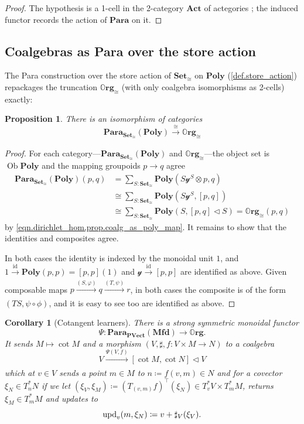 \documentclass[11pt, oneside, article]{memoir}
\theoremstyle{definition}
\theoremstyle{plain}
\newtheorem{proposition}[proposition]{Proposition}
\newtheorem{corollary}[corollary]{Corollary}
\DeclareMathOperator{\ob}{Ob}
\newcommand{\Cat}[1]{\mathbf{#1}}%
\newcommand{\id}{\mathrm{id}}
\newcommand{\To}[2][]{\xrightarrow[#1]{#2}}
\newcommand{\tn}[1]{\textnormal{#1}}
\newcommand{\smset}{\Cat{Set}}
\newcommand{\upd}{\tn{upd}}
\newcommand{\yon}{\mathcal{y}}
\newcommand{\poly}{\Cat{Poly}}
\newcommand{\tri}{\mathbin{\triangleleft}}
\newcommand{\org}{{\mathbb{O}\Cat{rg}}}
\newcommand{\mfd}{\Cat{Mfd}}
\newcommand{\Para}{\Cat{Para}}
\newcommand{\para}[2]{\Para_{#1}(#2)}
\newcommand{\pvect}{\Cat{PVect}}
\begin{document}
\begin{proof}
The hypothesis is a 1-cell in the 2-category $\Cat{Act}$ of actegories \cite[\S 3.6, eq.~(3.59)]{capucci2024actegories}; the induced functor records the action of $\Cat{Para}$ on it.\qedhere
\end{proof}

\subsection{Coalgebras as Para over the store action}\label{sec.org_as_para}

The Para construction over the store action of $\smset_\cong$ on $\poly$ (\cref{def.store_action}) repackages the truncation $\org_{\cong}$ (with only coalgebra isomorphisms as 2-cells) exactly:

\begin{proposition}\label{prop.org_as_para}
There is an isomorphism of categories
\[
\para{\Cat{Set}_{\cong}}{\poly}\To{\cong}\org_\cong
\]
\end{proposition}

\begin{proof}
For each category---$\para{\Cat{Set}_{\cong}}{\poly}$ and $\org_\cong$---the object set is $\ob\poly$ and the mapping groupoids $p\to q$ agree
\begin{align*}
	\para{\Cat{Set}_{\cong}}{\poly}(p,q)&=
  \sum_{S:\smset_\cong}\poly(S\yon^S\otimes p, q)\\&\cong
  \sum_{S:\smset_\cong}\poly(S\yon^S,[p,q])\\&\cong
  \sum_{S:\smset_\cong}\poly(S,[p,q]\tri S)=\org_\cong(p,q)
\end{align*}
by \cref{eqn.dirichlet_hom,prop.coalg_as_poly_map}. It remains to show that the identities and composites agree. 

In both cases the identity is indexed by the monoidal unit $1$, and $1\To{\id}\poly(p,p)=[p,p](1)$ and $\yon\To{\id}[p,p]$ are identified as above. Given composable maps $p\To{(S,\varphi)}q\To{(T,\psi)}r$, in both cases the composite is of the form $(TS,\psi\circ\phi)$, and it is easy to see too are identified as above.
\end{proof}

\begin{corollary}[Cotangent learners]\label{cor.cotangent_learners}
There is a strong symmetric monoidal functor
\begin{equation}\label{eqn.cotangent_learners}
\Psi\colon\para{\pvect}{\mfd}\to\org.
\end{equation}
It sends $M\mapsto\cot{M}$ and a morphism $(V, \sharp,f\colon V\times M\to N)$ to a coalgebra
\[
V\To{\Psi(V,f)}[\cot{M},\cot{N}]\tri V
\]
which at $v\in V$ sends a point $m\in M$ to  $n\coloneqq f(v,m)\in N$ and for a covector $\xi_N\in T^*_nN$ if we let $(\xi_V,\xi_M)\coloneqq(T_{(v,m)} f)^\top(\xi_N)\in T_v^*V\times T_m^*M$, returns $\xi_M\in T^*_mM$ and updates to
\begin{equation}\label{eqn.cotangent_learner_update}
\upd_v(m,\xi_N)\coloneqq v+\sharp_V(\xi_V).
\end{equation}
\end{corollary}
\end{document}
